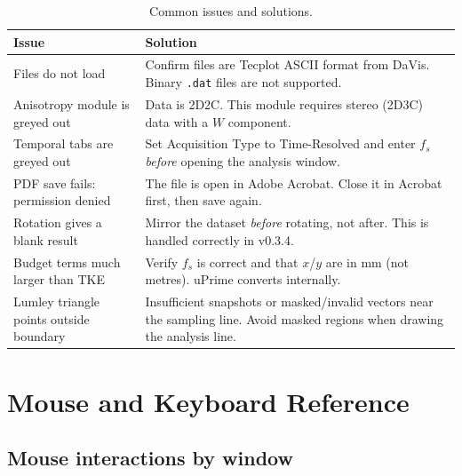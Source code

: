 \documentclass[11pt, a4paper]{report}
\begin{document}
\begin{table}[htbp]
\centering
\caption{Common issues and solutions.}
\begin{tabular}{p{5.2cm}p{8.8cm}}
\toprule
\textbf{Issue} & \textbf{Solution} \\
\midrule
Files do not load & Confirm files are Tecplot ASCII format from DaVis. Binary \texttt{.dat} files are not supported. \\
\addlinespace
Anisotropy module is greyed out & Data is 2D2C. This module requires stereo (2D3C) data with a $W$ component. \\
\addlinespace
Temporal tabs are greyed out & Set Acquisition Type to Time-Resolved and enter $f_s$ \emph{before} opening the analysis window. \\
\addlinespace
PDF save fails: permission denied & The file is open in Adobe Acrobat. Close it in Acrobat first, then save again. \\
\addlinespace
Rotation gives a blank result & Mirror the dataset \emph{before} rotating, not after. This is handled correctly in v0.3.4. \\
\addlinespace
Budget terms much larger than TKE & Verify $f_s$ is correct and that $x$/$y$ are in mm (not metres). uPrime converts internally. \\
\addlinespace
Lumley triangle points outside boundary & Insufficient snapshots or masked/invalid vectors near the sampling line. Avoid masked regions when drawing the analysis line. \\
\bottomrule
\end{tabular}
\end{table}

\chapter{Mouse and Keyboard Reference}

\section{Mouse interactions by window}
\end{document}
